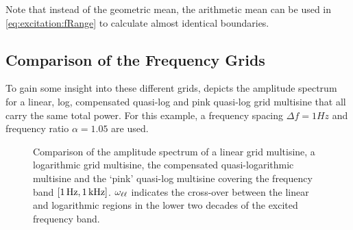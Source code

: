   Note that instead of the geometric mean, the arithmetic mean can be used in \eqref{eq:excitation:fRange} to calculate almost identical boundaries.

  \subsection{Comparison of the Frequency Grids}
  To gain some insight into these different grids,  depicts the amplitude spectrum for a linear, log, compensated quasi-log and pink quasi-log grid multisine that all carry the same total power.
  For this example, a frequency spacing $\Delta f = 1\unit{Hz}$ and frequency ratio $\alpha = 1.05$ are used.
  
  \begin{figure}[ht]
    \centering
      \setlength{}
      \setlength\figureheight{0.5\figurewidth}
    
    \caption[Amplitude spectrum for linear, logarithmic, quasi-logarithmic grids.]{Comparison of the amplitude spectrum of a linear grid multisine, a logarithmic grid multisine, the compensated quasi-logarithmic multisine and the `pink' quasi-log multisine covering the frequency band $\left[ 1\,\mathrm{Hz}, 1 \,\mathrm{kHz} \right]$.
    $\omega_{\ell \ell}$ indicates the cross-over between the linear and logarithmic regions in the lower two decades of the excited frequency band.}%
    \label{fig:excitation:freqGrids}
  \end{figure}

